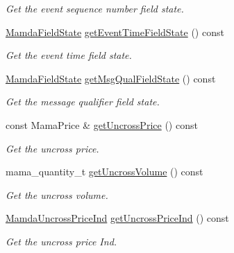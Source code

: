 \begin{CompactItemize}
\begin{CompactList}\small\item\em Get the event sequence number field state. \item\end{CompactList}\item 
\hyperlink{namespaceWombat_93aac974f2ab713554fd12a1fa3b7d2a}{Mamda\-Field\-State} \hyperlink{classWombat_1_1MamdaAuctionListener_c156f3f2735c0064ac4bafe6e6ad7eac}{get\-Event\-Time\-Field\-State} () const 
\begin{CompactList}\small\item\em Get the event time field state. \item\end{CompactList}\item 
\hyperlink{namespaceWombat_93aac974f2ab713554fd12a1fa3b7d2a}{Mamda\-Field\-State} \hyperlink{classWombat_1_1MamdaAuctionListener_c70e8a3a46013d656e67750a2dc83fb4}{get\-Msg\-Qual\-Field\-State} () const 
\begin{CompactList}\small\item\em Get the message qualifier field state. \item\end{CompactList}\item 
const Mama\-Price \& \hyperlink{classWombat_1_1MamdaAuctionListener_d048e1fc8517df34c118245b89069da0}{get\-Uncross\-Price} () const 
\begin{CompactList}\small\item\em Get the uncross price. \item\end{CompactList}\item 
mama\_\-quantity\_\-t \hyperlink{classWombat_1_1MamdaAuctionListener_f6f979ad6d52cb722c975cbc0e5fd177}{get\-Uncross\-Volume} () const 
\begin{CompactList}\small\item\em Get the uncross volume. \item\end{CompactList}\item 
\hyperlink{namespaceWombat_4f0ec767cbe150ee160f65e719e76226}{Mamda\-Uncross\-Price\-Ind} \hyperlink{classWombat_1_1MamdaAuctionListener_e42ba9609a3c40772a5cc3b89d5c5a93}{get\-Uncross\-Price\-Ind} () const 
\begin{CompactList}\small\item\em Get the uncross price Ind. \item\end{CompactList}\item 

\end{CompactItemize}
